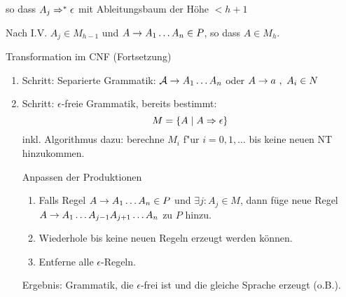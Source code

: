 so dass $A_j \=>^* \epsilon$ mit Ableitungsbaum der Höhe $<h+1$

Nach I.V. $A_j\in M_{h-1}$ und $A \-> A_1\dots A_n \in P$, so dass $ A \in M_h$.


%
%
Transformation im \ac{CNF} (Fortsetzung)
\begin{enumerate}
\item Schritt: Separierte Grammatik: $\A\->A_1\dots A_n$ oder $A\-> a\ ,\ A_i\in N$
\item Schritt: $\epsilon$-freie Grammatik, bereits bestimmt:
	\[ M=\{A \mid A\=> \epsilon \} \]
	inkl. Algorithmus dazu: berechne $M_i$ f"ur $i=0, 1, \dots$ bis keine neuen NT hinzukommen. 
	
	Anpassen der Produktionen
	\begin{enumerate}
		\item\label{itm:Prod-b} Falls Regel $A\-> A_1\dots A_n\in P$ und $\exists j:A_j\in M$, dann füge neue Regel\\
			$A\->A_1\dots A_{j-1} A_{j+1}\dots A_n$ zu $P$ hinzu.
		\item Wiederhole  bis keine neuen Regeln erzeugt werden können.
		\item Entferne alle $\epsilon$-Regeln.
	\end{enumerate}
	Ergebnis: Grammatik, die $\epsilon$-frei ist und die gleiche Sprache erzeugt (o.B.).


\end{enumerate}
